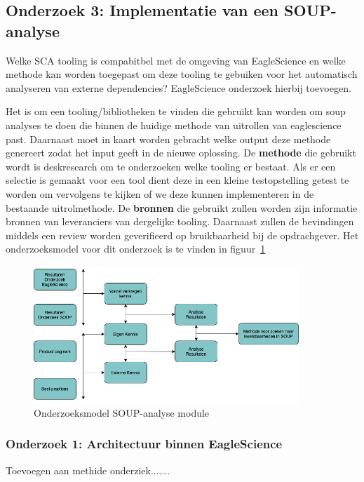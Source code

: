 {\subsection{Onderzoek 3: Implementatie van een SOUP-analyse}\label{subsec:onderzoek-naar-soup-analyse}

Welke SCA tooling is compabitbel met de omgeving van EagleScience en welke methode kan worden toegepast om deze tooling te gebuiken voor het automatisch analyseren van externe dependencies? EagleScience onderzoek hierbij toevoegen.


Het  is om een tooling/bibliotheken te vinden die gebruikt kan worden om soup analyses te doen die binnen de huidige methode van uitrollen van eaglescience past. Daarnaast moet in kaart worden gebracht welke output deze methode genereert zodat het input geeft in de nieuwe oplossing. De \textbf{methode} die gebruikt wordt is deskresearch om te onderzoeken welke tooling er bestaat. Als er een selectie is gemaakt voor een tool dient deze in een kleine testopstelling getest te worden om vervolgens te kijken of we deze kunnen implementeren in de bestaande uitrolmethode. De \textbf{bronnen} die gebruikt zullen worden zijn informatie bronnen van leveranciers van dergelijke tooling. Daarnaast zullen de bevindingen middels een review worden geverifieerd op bruikbaarheid bij de opdrachgever. Het onderzoeksmodel voor dit onderzoek is te vinden in figuur~\ref{fig:OnderzoeksModelSOUPmethode}

\begin{figure}[htbp]
    \myfloatalign
    \includegraphics[width=10cm]{gfx/OnderzoeksModelSOUPMethode}
    \caption{Onderzoeksmodel SOUP-analyse module}
    \label{fig:OnderzoeksModelSOUPmethode}
\end{figure}

\subsubsection{Onderzoek 1: Architectuur binnen EagleScience}\label{subsec:onderzoeksmethode-architectuur-binnen-eaglescience}
Toevoegen aan methide onderziek.......


}
